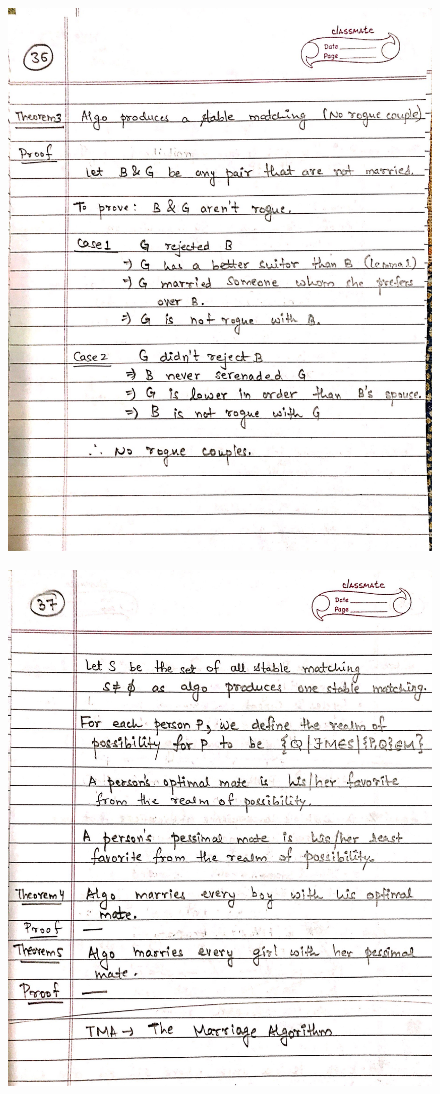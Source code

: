 \begin{figure}[H]
    \centering
    \includegraphics[scale=0.25]{"./MIT-6.042J/MIT-6042J-036"}
\end{figure}
\newpage
\begin{figure}[H]
    \centering
    \includegraphics[scale=0.25]{"./MIT-6.042J/MIT-6042J-037"}
\end{figure}
